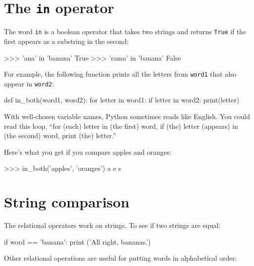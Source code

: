 \section{The {\tt in} operator}
\label{inboth}


The word {\tt in} is a boolean operator that takes two strings and
returns {\tt True} if the first appears as a substring in the second:

\beforeverb
\begin{pyinterpreter}
>>> 'ana' in 'banana'
True
>>> 'rama' in 'banana'
False
\end{pyinterpreter}
\afterverb
%
For example, the following function prints all the
letters from {\tt word1} that also appear in {\tt word2}:

\beforeverb
\begin{pycode}
def in_both(word1, word2):
    for letter in word1:
        if letter in word2:
            print(letter)
\end{pycode}
\afterverb
%
With well-chosen variable names,
Python sometimes reads like English.  You could read
this loop, ``for (each) letter in (the first) word, if (the) letter 
(appears) in (the second) word, print (the) letter.''

Here's what you get if you compare apples and oranges:

\beforeverb
\begin{pyinterpreter}
>>> in_both('apples', 'oranges')
a
e
s
\end{pyinterpreter}
\afterverb
%

\section{String comparison}


The relational operators work on strings.  To see if two strings are equal:

\beforeverb
\begin{pycode}
if word == 'banana':
    print ('All right, bananas.')
\end{pycode}
\afterverb
%
Other relational operations are useful for putting words in alphabetical
order:

